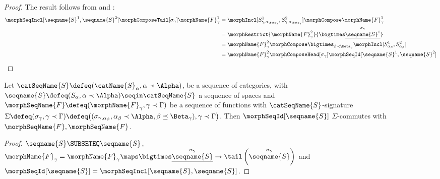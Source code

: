 \documentclass{article}
\begin{document}
\begin{lemma}
\begin{proof}
The result follows from  and
{
  \showlabelsinline
}:
\begin{equation*}
\begin{split}
    \morphSeqIncl[{\seqname{S}^1},{\seqname{S}^2}] \morphComposeTail[\sigma_\gamma]
    \morphName{F}^1_\gamma
  & =
    \morphIncl%
      [
        S^1_{\gamma,\alpha_{\Beta_\gamma}},
        S^2_{\gamma,\alpha_{\Beta_\gamma}}
      ]
    \morphCompose
    \morphName{F}^1_\gamma
\\*
  & =
    \morphRestrict{\morphName{F}^2_\gamma}{\bigtimes \underline{\overset{\sigma_\gamma}{\seqname{S}^1}}}
\\*
  & =
    \morphName{F}^2_\gamma \morphCompose
    \bigtimes_{\beta \prec \Beta_\gamma}
      \morphIncl[{S^1_{\alpha_\beta}},{S^2_{\alpha_\beta}}]
\\*
  & =
    \morphName{F}^2_\gamma \morphComposeHead[\sigma_\gamma]
    \morphSeqId[{{\seqname{S}^1},{\seqname{S}^2}}]
\end{split}
\end{equation*}
\end{proof}
\end{lemma}

\begin{corollary}
\label{cor:Sigmacomm}
Let
$
  \catSeqName{S} \defeq (\catName{S}_\alpha, \alpha \prec \Alpha)
$,
be a sequence of categories, with
$
  \seqname{S} \defeq (S_\alpha, \alpha \prec \Alpha)
  \seqin \catSeqName{S}
$
a sequence of spaces and
$\morphSeqName{F} \defeq (\morphName{F}_\gamma, \gamma \prec \Gamma)$
be a sequence of functions with $\catSeqName{S}$-signature
$
  \Sigma \defeq (\sigma_\gamma, \gamma \prec \Gamma) \defeq
  \bigl (
    (
      \sigma_{\gamma,\alpha_\beta}, \alpha_\beta \prec \Alpha,
      \beta \preceq \Beta_\gamma
    ),
    \gamma \prec \Gamma
  \bigr )
$.
Then $\morphSeqId[{\seqname{S}}]$ $\Sigma$-commutes with
$\morphSeqName{F},\morphSeqName{F}$.

\begin{proof}
$\seqname{S} \SUBSETEQ \seqname{S}$,
$
  \morphName{F}_\gamma =
  \morphName{F}_\gamma \maps
    \bigtimes \underline{\overset{\sigma_\gamma}{\seqname{S}}} \to
    \tail \left ( \overset{\sigma_\gamma}{\seqname{S}} \right )
$
and $\morphSeqId[{\seqname{S}}] = \morphSeqIncl[{\seqname{S}},{\seqname{S}}]$.
\end{proof}
\end{corollary}
\end{document}
